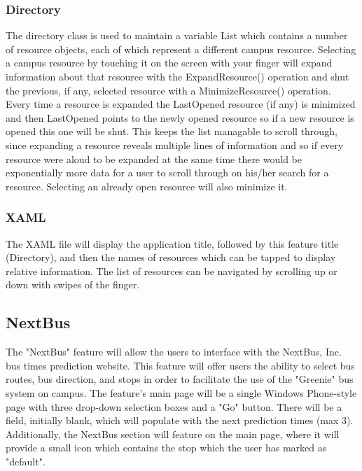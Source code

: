 \documentclass[pdftex,12pt,letter]{article}
\begin{document}
\subsubsection{Directory}
The directory class is used to maintain a variable List which contains a number of resource objects, each of which represent a different campus resource. Selecting a campus resource by touching it on the screen with your finger will expand information about that resource with the ExpandResource() operation and shut the previous, if any, selected resource with a MinimizeResource() operation. Every time a resource is expanded the LastOpened resource (if any) is minimized and then LastOpened points to the newly opened resource so if a new resource is opened this one will be shut. This keeps the list managable to scroll through, since expanding a resource reveals multiple lines of information and so if every resource were aloud to be expanded at the same time there would be exponentially more data for a user to scroll through on his/her search for a resource. Selecting an already open resource will also minimize it.
\subsubsection{XAML}
The XAML file will display the application title, followed by this feature title
(Directory), and then the names of resources which can be tapped to display relative information. The list of resources can be navigated by scrolling up or down with swipes of the finger. 
\subsection{NextBus}
The "NextBus" feature will allow the users to interface with the NextBus, Inc. bus times prediction website. This feature will offer users the ability to select bus routes, bus direction, and stops in order to facilitate the use of the "Greenie" bus system on campus. The feature's main page will be a single Windows Phone-style page with three drop-down selection boxes and a "Go" button. There will be a field, initially blank, which will populate with the next prediction times (max 3). Additionally, the NextBus section will feature on the main page, where it will provide a small icon which contains the stop which the user has marked as "default".
\end{document}

